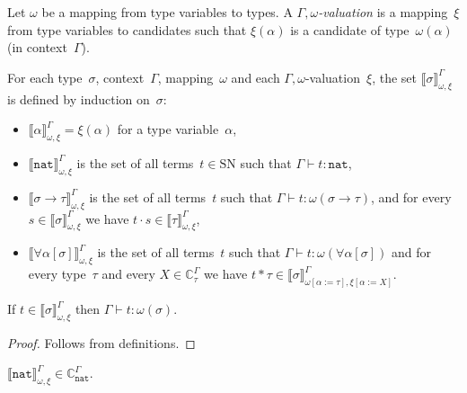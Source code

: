 \documentclass[runningheads,a4paper]{llncs}
\newcommand{\app}[2]{#1 \cdot #2}
\newcommand{\tapp}[2]{#1 * #2}
\newcommand{\subst}[2]{#1:=#2}
\newcommand{\nat}{\mathtt{nat}}
\newcommand{\SN}{\mathrm{SN}}
\newcommand{\Cb}{\mathbb{C}}
\newcommand{\val}[3]{\ensuremath{\llbracket#1\rrbracket_{#2}^{#3}}}
\newcommand{\proves}{\vdash}
\begin{document}
\begin{definition}\label{def_reducibility_valuation}
  Let $\omega$ be a mapping from type variables to types. A
  \emph{$\Gamma,\omega$-valuation} is a mapping~$\xi$ from type
  variables to candidates such that $\xi(\alpha)$ is a candidate of
  type~$\omega(\alpha)$ (in context~$\Gamma$).

  For each type~$\sigma$, context~$\Gamma$, mapping~$\omega$
  and each $\Gamma,\omega$-valuation~$\xi$, the set $\val{\sigma}{\omega,\xi}{\Gamma}$ is
  defined by induction on~$\sigma$:
  \begin{itemize}
  \item $\val{\alpha}{\omega,\xi}{\Gamma} = \xi(\alpha)$ for a type
    variable~$\alpha$,
  \item $\val{\nat}{\omega,\xi}{\Gamma}$ is the set of all
    terms~$t \in \SN$ such that $\Gamma \proves t : \nat$,
  \item $\val{\sigma \to \tau}{\omega,\xi}{\Gamma}$ is the set of all
    terms~$t$ such that $\Gamma \proves t : \omega(\sigma \to \tau)$,
    and for every~$s \in \val{\sigma}{\omega,\xi}{\Gamma}$ we have
    $\app{t}{s} \in \val{\tau}{\omega,\xi}{\Gamma}$,
  \item $\val{\forall\alpha[\sigma]}{\omega,\xi}{\Gamma}$ is the set
    of all terms~$t$ such that
    $\Gamma \proves t : \omega(\forall\alpha[\sigma])$ and for every
    type~$\tau$ and every $X \in \Cb_\tau^\Gamma$ we have
    $\tapp{t}{\tau} \in \val{\sigma}{\omega[\subst{\alpha}{\tau}],
    \xi[\subst{\alpha}{X}]}{\Gamma}$.
  \end{itemize}
\end{definition}

\begin{lemma}\label{lem_val_typable}
  If $t \in \val{\sigma}{\omega,\xi}{\Gamma}$ then
  $\Gamma \proves t : \omega(\sigma)$.
\end{lemma}

\begin{proof}
  Follows from definitions.
\end{proof}

\begin{lemma}\label{lem_nat_reducible}
  $\val{\nat}{\omega,\xi}{\Gamma} \in \Cb_{\nat}^\Gamma$.
\end{lemma}
\end{document}
